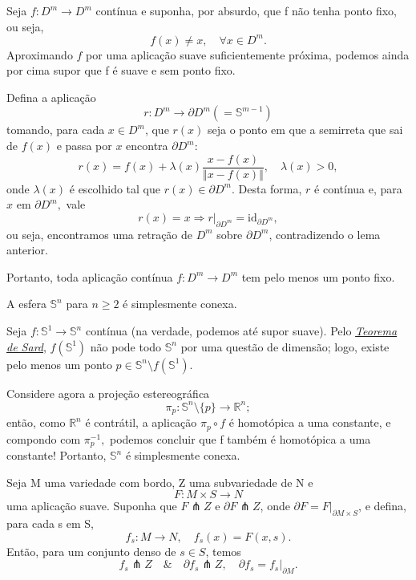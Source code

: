 \documentclass[../differential_topology.tex]{subfiles}
\begin{document}
\begin{proof*}
	Seja \(f:D^{m}\rightarrow D^{m}\) contínua e suponha, por absurdo, que f não tenha ponto fixo, ou seja,
	\[
		f(x)\neq x, \quad \forall x\in D^{m}.
	\]
	Aproximando \(f\) por uma aplicação suave suficientemente próxima, podemos ainda por cima supor que f é suave e sem ponto fixo.

	Defina a aplicação
	\[
		r:D^{m}\rightarrow \partial D^{m} (=\mathbb{S}^{m-1})
	\]
	tomando, para cada \(x\in D^{m}\), que \(r(x)\) seja o ponto em que a semirreta que sai de \(f(x)\) e passa por \(x\) encontra \(\partial D^{m}\):
	\[
		r(x) = f(x) + \lambda (x)\frac{x-f(x)}{\Vert x-f(x) \Vert}, \quad \lambda (x)>0,
	\]
	onde \(\lambda (x)\) é escolhido tal que \(r(x)\in \partial D^{m}\). Desta forma, \(r\) é contínua e, para \(x\) em \(\partial D^{m},\) vale
	\[
		r(x) = x \Rightarrow r|_{\partial D^{m}} = \mathrm{id}_{\partial D^{m}},
	\]
	ou seja, encontramos uma retração de \(D^{m}\) sobre \(\partial D^{m}\), contradizendo o lema anterior.

	Portanto, toda aplicação contínua \(f:D^{m}\rightarrow D^{m}\) tem pelo menos um ponto fixo.
\end{proof*}
\begin{theorem*}
	A esfera \(\mathbb{S}^{n}\) para \(n\geq 2\) é simplesmente conexa.
\end{theorem*}
\begin{proof*}
	Seja \(f:\mathbb{S}^{1}\rightarrow \mathbb{S}^{n}\) contínua (na verdade, podemos até supor suave). Pelo \hyperlink{sard_theorem}{\textit{Teorema de Sard}}, \(f(\mathbb{S}^{1})\) não pode todo \(\mathbb{S}^{n}\) por uma questão de dimensão; logo, existe pelo menos um ponto \(p\in \mathbb{S}^{n}\setminus{f(\mathbb{S}^{1})}\).

	Considere agora a projeção estereográfica
	\[
		\pi_{p}:\mathbb{S}^{n}\setminus{\{p\}}\rightarrow \mathbb{R}^{n};
	\]
	então, como \(\mathbb{R}^{n}\) é contrátil, a aplicação \(\pi_{p}\circ f\) é homotópica a uma constante, e compondo com \(\pi_{p}^{-1},\) podemos concluir que f também é homotópica a uma constante! Portanto, \(\mathbb{S}^{n}\) é simplesmente conexa. \qedsymbol
\end{proof*}
\hypertarget{transversality_theorem}{
	\begin{theorem*}
		Seja M uma variedade com bordo, Z uma subvariedade de N e
		\[
			F:M\times S\rightarrow N
		\]
		uma aplicação suave. Suponha que \(F\pitchfork Z\) e \(\partial F \pitchfork Z\), onde \(\partial F = F|_{\partial M\times S}\), e defina, para cada s em S,
		\[
			f_{s}:M\rightarrow N, \quad f_{s}(x) = F(x, s).
		\]
		Então, para um conjunto denso de \(s\in S\), temos
		\[
			f_{s}\pitchfork Z \quad\&\quad \partial f_{s}\pitchfork Z, \quad \partial f_{s} = f_{s}|_{\partial M}.
		\]
	\end{theorem*}
}
\end{document}

